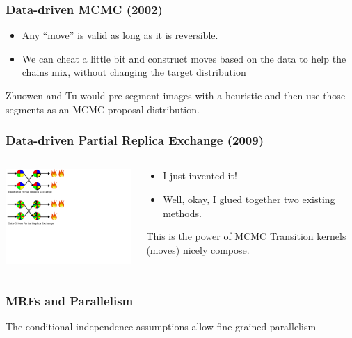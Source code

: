 \documentclass[compress]{beamer}
\begin{document}
\begin{frame}
  \frametitle{Data-driven MCMC (2002)}
  \begin{itemize}
    \item Any ``move'' is valid as long as it is reversible.  
    \item We can cheat a little bit and construct moves based on the data to help the chains mix, 
      without changing the target distribution
  \end{itemize}
  
  Zhuowen and Tu \cite{zhuowen_tu_image_2002} would pre-segment images
  with a heuristic and then use those segments as an MCMC proposal
  distribution.

\end{frame}

\begin{frame}
  \frametitle{Data-driven Partial Replica Exchange (2009)}
  \begin{columns}
    \begin{column}{6cm}
      \includegraphics[width=7cm]{my_partial}
    \end{column}
    
    \begin{column}{4cm}
      \begin{itemize}[<+->]
      \item I just invented it! 
      \item Well, okay, I glued together two existing methods. 
      \end{itemize}
      \pause
      \begin{block}{This is the power of MCMC}
        Transition kernels (moves) nicely compose. 
      \end{block}
    \end{column}
  \end{columns}
\end{frame}
  
\begin{frame}
  \frametitle{MRFs and Parallelism}
  The conditional independence assumptions allow fine-grained parallelism
  
\end{frame}
\end{document}
